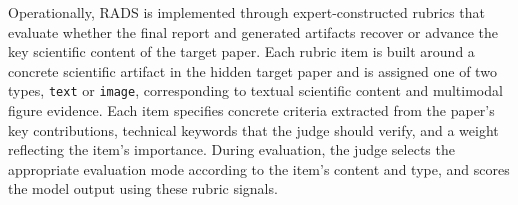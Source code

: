 Operationally, RADS is implemented through expert-constructed rubrics that evaluate whether the final report and generated artifacts recover or advance the key scientific content of the target paper. Each rubric item is built around a concrete scientific artifact in the hidden target paper and is assigned one of two types, \texttt{text} or \texttt{image}, corresponding to textual scientific content and multimodal figure evidence. Each item specifies concrete criteria extracted from the paper's key contributions, technical keywords that the judge should verify, and a weight reflecting the item's importance. During evaluation, the judge selects the appropriate evaluation mode according to the item's content and type, and scores the model output using these rubric signals.
